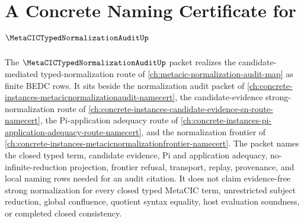\chapter{A Concrete Naming Certificate for $\MetaCICTypedNormalizationAuditUp$}
\label{ch:concrete-instances-metacic-typed-normalization-audit-namecert}

The $\MetaCICTypedNormalizationAuditUp$ packet realizes the candidate-mediated typed-normalization route of \autoref{ch:metacic-normalization-audit-map} as finite BEDC rows. It sits beside the normalization audit packet of \autoref{ch:concrete-instances-metacicnormalizationaudit-namecert}, the candidate-evidence strong-normalization route of \autoref{ch:concrete-instances-candidate-evidence-sn-route-namecert}, the Pi-application adequacy route of \autoref{ch:concrete-instances-pi-application-adequacy-route-namecert}, and the normalization frontier of \autoref{ch:concrete-instances-metacicnormalizationfrontier-namecert}. The packet names the closed typed term, candidate evidence, Pi and application adequacy, no-infinite-reduction projection, frontier refusal, transport, replay, provenance, and local naming rows needed for an audit citation. It does not claim evidence-free strong normalization for every closed typed MetaCIC term, unrestricted subject reduction, global confluence, quotient syntax equality, host evaluation soundness, or completed closed consistency.

